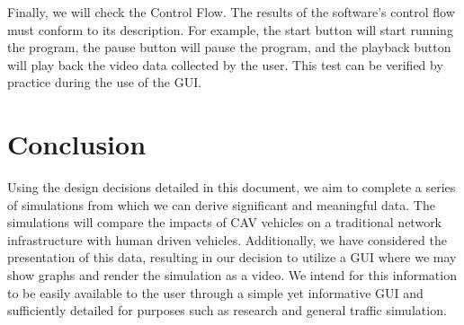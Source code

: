 \documentclass[onecolumn, draftclsnofoot,10pt, compsoc]{IEEEtran}
\begin{document}
Finally, we will check the Control Flow.
The results of the software's control flow must conform to its description.
For example, the start button will start running the program, the pause button will pause the program, and the playback button will play back the video data collected by the user.
This test can be verified by practice during the use of the GUI.
\section{Conclusion}
Using the design decisions detailed in this document, we aim to complete a series of simulations from which we can derive significant and meaningful data.
The simulations will compare the impacts of CAV vehicles on a traditional network infrastructure with human driven vehicles.
Additionally, we have considered the presentation of this data, resulting in our decision to utilize a GUI where we may show graphs and render the simulation as a video.
We intend for this information to be easily available to the user through a simple yet informative GUI and sufficiently detailed for purposes such as research and general traffic simulation.
\end{document}
